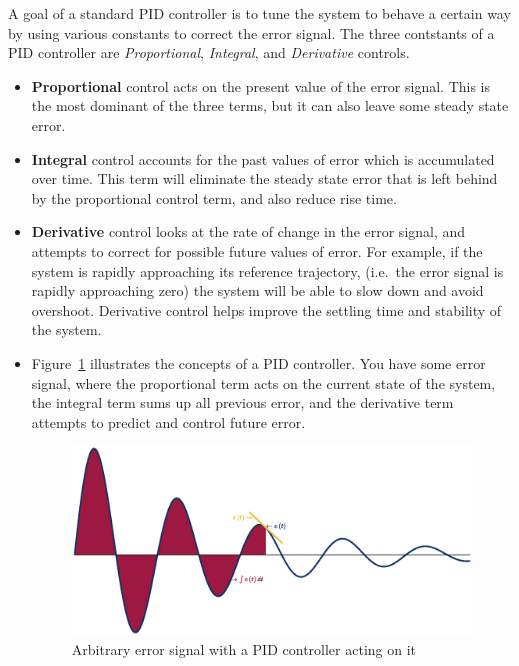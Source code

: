 A goal of a standard PID controller is to  tune the system to behave a certain
way by using various constants to correct the error signal. The three contstants
of a PID controller are \emph{Proportional}, \emph{Integral}, and \emph{Derivative}
controls.
\begin{itemize}
    \item \textbf{Proportional} control acts on the present value of the error signal. This is the most
          dominant of the three terms, but it can also leave some steady state error.
    \item\textbf{Integral} control accounts for the past values of error which is accumulated over time.
          This term will eliminate the steady state error that is left behind by the proportional control
          term, and also reduce rise time.
    \item \textbf{Derivative} control looks at the rate of change in the error signal, and attempts to
          correct for possible future values of error. For example, if the system is rapidly approaching
          its reference trajectory, (i.e.\ the error signal is rapidly approaching zero) the system will be
          able to slow down and avoid overshoot. Derivative control helps improve the settling time and
          stability of the system.
    \item Figure~\ref{fig:PIDExp} illustrates the concepts of a PID controller. You have some error
          signal, where the proportional term acts on the current state of the system, the integral term
          sums up all previous error, and the derivative term attempts to predict and control future error.

          \begin{figure}
              \centering
              \includegraphics[width = 0.8\hsize]{pix/PIDSchematic.eps}
              \caption{Arbitrary error signal with a PID controller acting on it}\label{fig:PIDExp}
          \end{figure}

\end{itemize}
